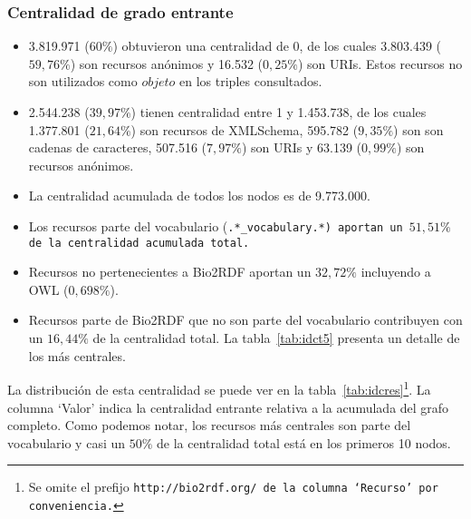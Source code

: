 \subsubsection{Centralidad de grado entrante}
\begin{itemize}
  \item
    3.819.971 ($60\%$) obtuvieron una centralidad de 0, de los cuales
    3.803.439 ($59,76\%$) son recursos anónimos y 16.532 ($0,25\%$) son URIs.
    Estos recursos no son utilizados como $objeto$ en los triples consultados.
  \item
    2.544.238 ($39,97\%$) tienen centralidad entre 1 y 1.453.738, de los cuales
    1.377.801 ($21,64\%$) son recursos de XMLSchema, 
    595.782 ($9,35\%$) son son cadenas de caracteres,
    507.516 ($7,97\%$) son URIs y
    63.139 ($0,99\%$) son recursos anónimos.
  \item La centralidad acumulada de todos los nodos es de 9.773.000.
  \item 
    Los recursos parte del vocabulario (\tt{.*\_vocabulary.*}) aportan un 
    $51,51\%$ de la centralidad acumulada total.
  \item
    Recursos no pertenecientes a Bio2RDF aportan un $32,72\%$ incluyendo a OWL 
    ($0,698\%$).
  \item 
    Recursos parte de Bio2RDF que no son parte del vocabulario contribuyen con
    un $16,44\%$ de la centralidad total. La tabla~\ref{tab:idct5} presenta un
    detalle de los más centrales.
\end{itemize}

La distribución de esta centralidad se puede ver en la
tabla~\ref{tab:idcres}\footnote{Se omite el prefijo \tt{http://bio2rdf.org/} de
la columna `Recurso' por conveniencia.}.
La columna `Valor' indica la centralidad entrante relativa a la acumulada del
grafo completo.
Como podemos notar, los recursos más centrales son parte del vocabulario y casi
un $50\%$ de la centralidad total está en los primeros 10 nodos.

